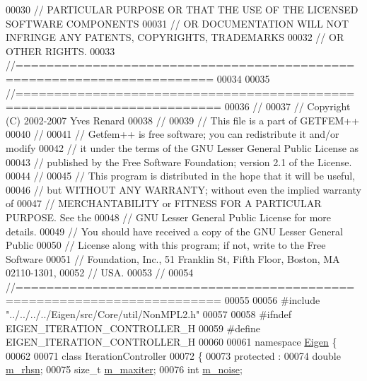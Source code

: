 \begin{DoxyCode}
00030 \textcolor{comment}{// PARTICULAR PURPOSE OR THAT THE USE OF THE LICENSED SOFTWARE COMPONENTS}
00031 \textcolor{comment}{// OR DOCUMENTATION WILL NOT INFRINGE ANY PATENTS, COPYRIGHTS, TRADEMARKS}
00032 \textcolor{comment}{// OR OTHER RIGHTS.}
00033 \textcolor{comment}{//=======================================================================}
00034 
00035 \textcolor{comment}{//========================================================================}
00036 \textcolor{comment}{//}
00037 \textcolor{comment}{// Copyright (C) 2002-2007 Yves Renard}
00038 \textcolor{comment}{//}
00039 \textcolor{comment}{// This file is a part of GETFEM++}
00040 \textcolor{comment}{//}
00041 \textcolor{comment}{// Getfem++ is free software; you can redistribute it and/or modify}
00042 \textcolor{comment}{// it under the terms of the GNU Lesser General Public License as}
00043 \textcolor{comment}{// published by the Free Software Foundation; version 2.1 of the License.}
00044 \textcolor{comment}{//}
00045 \textcolor{comment}{// This program is distributed in the hope that it will be useful,}
00046 \textcolor{comment}{// but WITHOUT ANY WARRANTY; without even the implied warranty of}
00047 \textcolor{comment}{// MERCHANTABILITY or FITNESS FOR A PARTICULAR PURPOSE.  See the}
00048 \textcolor{comment}{// GNU Lesser General Public License for more details.}
00049 \textcolor{comment}{// You should have received a copy of the GNU Lesser General Public}
00050 \textcolor{comment}{// License along with this program; if not, write to the Free Software}
00051 \textcolor{comment}{// Foundation, Inc., 51 Franklin St, Fifth Floor, Boston, MA  02110-1301,}
00052 \textcolor{comment}{// USA.}
00053 \textcolor{comment}{//}
00054 \textcolor{comment}{//========================================================================}
00055 
00056 \textcolor{preprocessor}{#include "../../../../Eigen/src/Core/util/NonMPL2.h"}
00057 
00058 \textcolor{preprocessor}{#ifndef EIGEN\_ITERATION\_CONTROLLER\_H}
00059 \textcolor{preprocessor}{#define EIGEN\_ITERATION\_CONTROLLER\_H}
00060 
00061 \textcolor{keyword}{namespace }\hyperlink{namespace_eigen}{Eigen} \{ 
00062 
00071 \textcolor{keyword}{class }IterationController
00072 \{
00073   protected :
00074     \textcolor{keywordtype}{double} \hyperlink{class_eigen_1_1_iteration_controller_a43364d62c43861aff44cb0a86c4615a6}{m\_rhsn};        
00075     \textcolor{keywordtype}{size\_t} \hyperlink{class_eigen_1_1_iteration_controller_a42f72b0f3d490a6ceaa7bc76a51c1471}{m\_maxiter};     
00076     \textcolor{keywordtype}{int} \hyperlink{class_eigen_1_1_iteration_controller_afcff4288066c186967f15defcd833f5d}{m\_noise};          

\end{DoxyCode}

